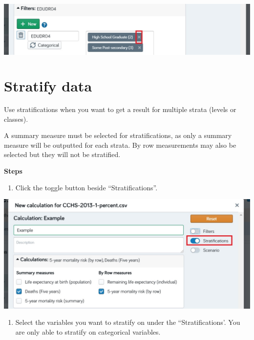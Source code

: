 \documentclass[]{book}
\providecommand{\tightlist}{%
  \setlength{\itemsep}{0pt}\setlength{\parskip}{0pt}}
\begin{document}
\begin{center}\includegraphics{Images/FilterRemove2} \end{center}

\section{Stratify data}\label{stratify-data}

Use stratifications when you want to get a result for multiple strata
(levels or classes).

A summary measure must be selected for stratifications, as only a
summary measure will be outputted for each strata. By row measurements
may also be selected but they will not be stratified.

\textbf{Steps}

\begin{enumerate}
\def\labelenumi{\arabic{enumi}.}
\tightlist
\item
  Click the toggle button beside ``Stratifications''.
\end{enumerate}

\begin{center}\includegraphics{Images/Strat} \end{center}

\begin{enumerate}
\def\labelenumi{\arabic{enumi}.}
\setcounter{enumi}{1}
\tightlist
\item
  Select the variables you want to stratify on under the
  ``Stratifications'. You are only able to stratify on categorical
  variables.
\end{enumerate}
\end{document}
